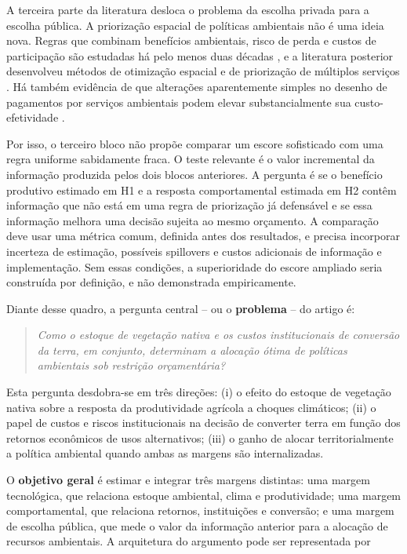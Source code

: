 A terceira parte da literatura desloca o problema da escolha privada para a escolha pública. A priorização espacial de políticas ambientais não é uma ideia nova. Regras que combinam benefícios ambientais, risco de perda e custos de participação são estudadas há pelo menos duas décadas \cite{wunscher2008targeting}, e a literatura posterior desenvolveu métodos de otimização espacial e de priorização de múltiplos serviços \cite{guo2020targeting}. Há também evidência de que alterações aparentemente simples no desenho de pagamentos por serviços ambientais podem elevar substancialmente sua custo-efetividade \cite{izquierdotort2024redesigning}.

Por isso, o terceiro bloco não propõe comparar um escore sofisticado com uma regra uniforme sabidamente fraca. O teste relevante é o valor incremental da informação produzida pelos dois blocos anteriores. A pergunta é se o benefício produtivo estimado em H1 e a resposta comportamental estimada em H2 contêm informação que não está em uma regra de priorização já defensável e se essa informação melhora uma decisão sujeita ao mesmo orçamento. A comparação deve usar uma métrica comum, definida antes dos resultados, e precisa incorporar incerteza de estimação, possíveis spillovers e custos adicionais de informação e implementação. Sem essas condições, a superioridade do escore ampliado seria construída por definição, e não demonstrada empiricamente.

Diante desse quadro, a pergunta central  -- ou o \textbf{problema} -- do artigo é:

\begin{quote}
\emph{Como o estoque de vegetação nativa e os custos institucionais de conversão da terra, em conjunto, determinam a alocação ótima de políticas ambientais sob restrição orçamentária?}
\end{quote}

Esta pergunta desdobra-se em três direções: (i) o efeito do estoque de vegetação nativa sobre a resposta da produtividade agrícola a choques climáticos; (ii) o papel de custos e riscos institucionais na decisão de converter terra em função dos retornos econômicos de usos alternativos; (iii) o ganho de alocar territorialmente a política ambiental quando ambas as margens são internalizadas.

O \textbf{objetivo geral} é estimar e integrar três margens distintas: uma margem tecnológica, que relaciona estoque ambiental, clima e produtividade; uma margem comportamental, que relaciona retornos, instituições e conversão; e uma margem de escolha pública, que mede o valor da informação anterior para a alocação de recursos ambientais. A arquitetura do argumento pode ser representada por


